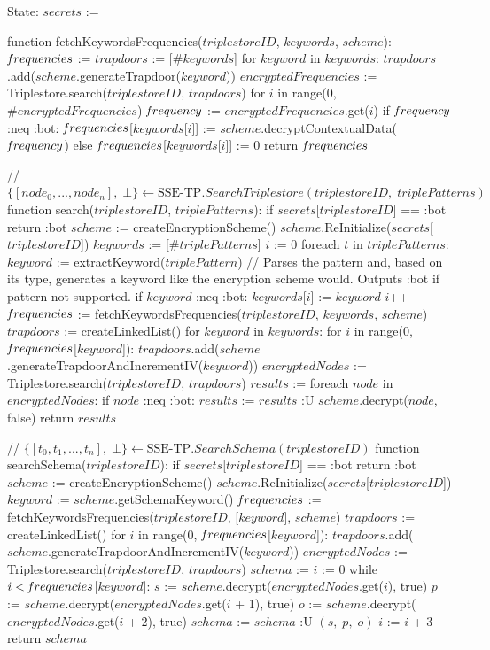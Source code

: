 State:
    $secrets$ := {}

function fetchKeywordsFrequencies($triplestoreID$, $keywords$, $scheme$):
    $\textrm{\emph{f}}requencies$ := {}
    $trapdoors$ := [$\#keywords$]
    for $keyword$ in $keywords$:
        $trapdoors$.add($scheme$.generateTrapdoor($keyword$))
    $encryptedFrequencies$ := Triplestore.search($triplestoreID$, $trapdoors$)
    for $i$ in range(0, $\#encryptedFrequencies$) 
        $\textrm{\emph{f}}requency$ := $encryptedFrequencies$.get($i$)
        if $\textrm{\emph{f}}requency$ :neq :bot: 
            $\textrm{\emph{f}}requencies$[$keywords$[$i$]] := $scheme$.decryptContextualData($\textrm{\emph{f}}requency$)
        else
            $\textrm{\emph{f}}requencies$[$keywords$[$i$]] := 0
    return $\textrm{\emph{f}}requencies$

// $\{[node_0, ..., node_n], \; \bot\} \leftarrow \textrm{SSE-TP}.SearchTriplestore(triplestoreID, \; triplePatterns)$
function search($triplestoreID$, $triplePatterns$):
    if $secrets$[$triplestoreID$] == :bot
        return :bot
    $scheme$ := createEncryptionScheme()
    $scheme$.ReInitialize($secrets$[$triplestoreID$])
    $keywords$ := [$\#triplePatterns$]
    $i$ := 0
    foreach $t$ in $triplePatterns$:
        $keyword$ := extractKeyword($triplePattern$) // Parses the pattern and, based on its type, generates a keyword like the encryption scheme would. Outputs :bot  if pattern not supported.
        if $keyword$ :neq :bot:
            $keywords$[$i$] := $keyword$
            $i$++
    $\textrm{\emph{f}}requencies$ := fetchKeywordsFrequencies($triplestoreID$, $keywords$, $scheme$)
    $trapdoors$ := createLinkedList()
    for $keyword$ in $keywords$:
        for $i$ in range(0, $\textrm{\emph{f}}requencies$[$keyword$]):
            $trapdoors$.add($scheme$.generateTrapdoorAndIncrementIV($keyword$))
    $encryptedNodes$ := Triplestore.search($triplestoreID$, $trapdoors$)
    $results$ := {}
    foreach $node$ in $encryptedNodes$:
        if $node$ :neq :bot:
            $results$ := $results$ :U { $scheme$.decrypt($node$, false) }
    return $results$    

// $\{[t_0, t_1, ..., t_n], \; \bot\} \leftarrow \textrm{SSE-TP}.SearchSchema(triplestoreID)$
function searchSchema($triplestoreID$):
    if $secrets$[$triplestoreID$] == :bot
        return :bot
    $scheme$ := createEncryptionScheme()
    $scheme$.ReInitialize($secrets$[$triplestoreID$])
    $keyword$ := $scheme$.getSchemaKeyword()
    $\textrm{\emph{f}}requencies$ := fetchKeywordsFrequencies($triplestoreID$, [$keyword$], $scheme$)
    $trapdoors$ := createLinkedList()
    for $i$ in range(0, $\textrm{\emph{f}}requencies$[$keyword$]):
        $trapdoors$.add($scheme$.generateTrapdoorAndIncrementIV($keyword$))
    $encryptedNodes$ := Triplestore.search($triplestoreID$, $trapdoors$)
    $schema$ := {}
    $i$ := 0
    while $i < \textrm{\emph{f}}requencies$[$keyword$]:
        $s$ := $scheme$.decrypt($encryptedNodes$.get($i$), true)
        $p$ := $scheme$.decrypt($encryptedNodes$.get($i$ + 1), true)
        $o$ := $scheme$.decrypt($encryptedNodes$.get($i$ + 2), true)
        $schema$ := $schema$ :U  { $(s, \; p, \; o)$ } 
        $i$ := $i$ + 3
    return $schema$